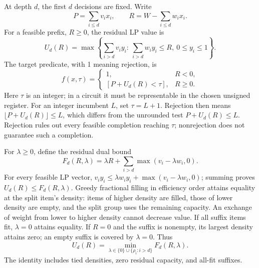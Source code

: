\documentclass[referee,pdflatex,sn-mathphys-num]{sn-jnl}
\theoremstyle{thmstyleone}
\theoremstyle{thmstyletwo}
\begin{document}
At depth $d$, the first $d$ decisions are fixed. Write
\begin{equation}
 P=\sum_{i\leq d}v_ix_i,\qquad R=W-\sum_{i\leq d}w_ix_i.
\end{equation}
For a feasible prefix, $R\geq0$, the residual LP value is
\begin{equation}\label{eq:lp}
 U_d(R)=\max\left\{\sum_{i>d}v_i y_i:\ \sum_{i>d}w_i y_i\leq R,\ 0\leq y_i\leq1\right\}.
\end{equation}
The target predicate, with 1 meaning rejection, is
\begin{equation}\label{eq:predicate}
 f(x,\tau)=\begin{cases}
 1,&R<0,\\
 [P+U_d(R)<\tau],&R\geq0.
 \end{cases}
\end{equation}
Here $\tau$ is an integer; in a circuit it must be representable in the chosen unsigned register. For an integer incumbent $L$, set $\tau=L+1$. Rejection then means $\lfloor P+U_d(R)\rfloor\leq L$, which differs from the unrounded test $P+U_d(R)\leq L$. Rejection rules out every feasible completion reaching $\tau$; nonrejection does not guarantee such a completion.

For $\lambda\geq0$, define the residual dual bound
\begin{equation}\label{eq:dual}
 F_d(R,\lambda)=\lambda R+\sum_{i>d}\max(v_i-\lambda w_i,0).
\end{equation}
For every feasible LP vector, $v_i y_i\leq\lambda w_i y_i+\max(v_i-\lambda w_i,0)$; summing proves $U_d(R)\leq F_d(R,\lambda)$. Greedy fractional filling in efficiency order attains equality at the split item's density: items of higher density are filled, those of lower density are empty, and the split group uses the remaining capacity. An exchange of weight from lower to higher density cannot decrease value. If all suffix items fit, $\lambda=0$ attains equality. If $R=0$ and the suffix is nonempty, its largest density attains zero; an empty suffix is covered by $\lambda=0$. Thus
\begin{equation}\label{eq:dualequality}
 U_d(R)=\min_{\lambda\in\{0\}\cup\{\rho_i:i>d\}}F_d(R,\lambda).
\end{equation}
The identity includes tied densities, zero residual capacity, and all-fit suffixes.
\end{document}
